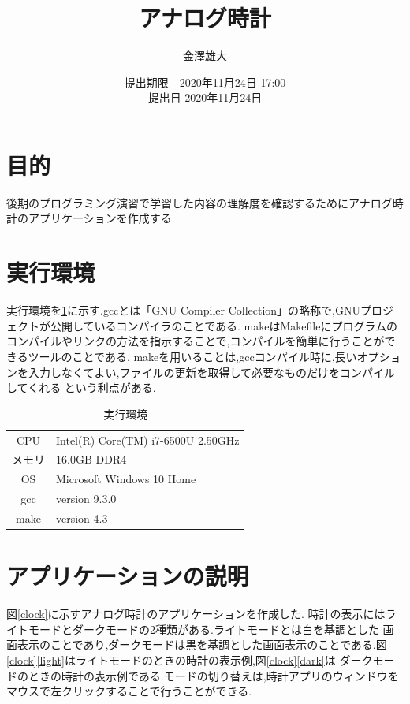 \documentclass[a4j]{jarticle}
\title{アナログ時計}
\date{提出期限　2020年11月24日 17:00 \\ 提出日 2020年11月24日}
\author{金澤雄大}
\begin{document}
    \maketitle
    \thispagestyle{empty}
    \clearpage
    \addtocounter{page}{-1}
    \section{目的}
    後期のプログラミング演習で学習した内容の理解度を確認するためにアナログ時計のアプリケーションを作成する.

    \section{実行環境}
    実行環境を\ref{env}に示す.gccとは「GNU Compiler Collection」の略称で,GNUプロジェクトが公開しているコンパイラのことである.
    makeはMakefileにプログラムのコンパイルやリンクの方法を指示することで,コンパイルを簡単に行うことができるツールのことである.
    makeを用いることは,gccコンパイル時に,長いオプションを入力しなくてよい,ファイルの更新を取得して必要なものだけをコンパイルしてくれる
    という利点がある.

    \begin{table}[H]
      \caption{実行環境}
    \label{env}
    \begin{center}
        \begin{tabular}{c|l}\hline
          CPU & Intel(R) Core(TM) i7-6500U 2.50GHz  \\ 
          メモリ & 16.0GB DDR4 \\
          OS & Microsoft Windows 10 Home \\
          gcc &  version 9.3.0 \\
          make & version 4.3 \\ \hline
        \end{tabular}
    \end{center}
    \end{table}

    \section{アプリケーションの説明}
    \label{s3}
    図\ref{clock}に示すアナログ時計のアプリケーションを作成した.
    時計の表示にはライトモードとダークモードの2種類がある.ライトモードとは白を基調とした
    画面表示のことであり,ダークモードは黒を基調とした画面表示のことである.図\ref{clock}\ref{light}はライトモードのときの時計の表示例,図\ref{clock}\ref{dark}は
    ダークモードのときの時計の表示例である.モードの切り替えは,時計アプリのウィンドウをマウスで左クリックすることで行うことができる.
\end{document}
